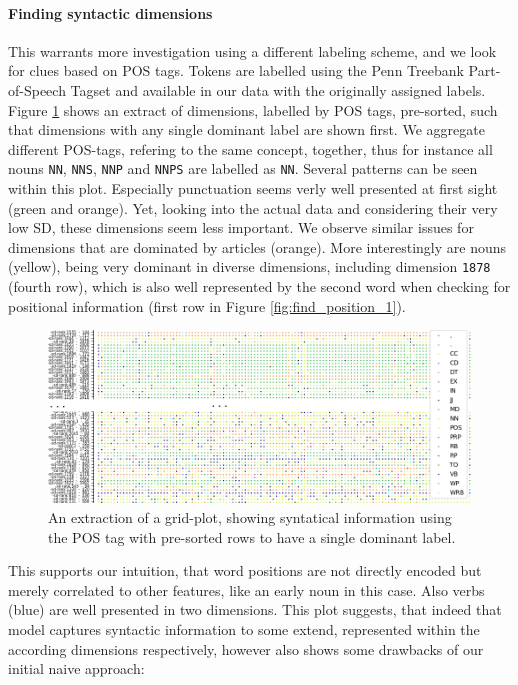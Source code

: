 \paragraph*{Finding syntactic dimensions}
This warrants more investigation using a different labeling scheme, and we look for clues based on \ac{POS} tags. Tokens are labelled using the Penn Treebank Part-of-Speech Tagset \citep{marcus1993building} and available in our data with the originally assigned labels. Figure \ref{fig:find_syntax} shows an extract of dimensions, labelled by \ac{POS} tags, pre-sorted, such that dimensions with any single dominant label are shown first. We aggregate different \ac{POS}-tags, refering to the same concept, together, thus for instance all nouns \texttt{NN}, \texttt{NNS}, \texttt{NNP} and \texttt{NNPS} are labelled as \texttt{NN}. Several patterns can be seen within this plot. Especially punctuation seems verly well presented at first sight (green and orange). Yet, looking into the actual data and considering their very low \ac{SD}, these dimensions seem less important. We observe similar issues for dimensions that are dominated by articles (orange). More interestingly are nouns (yellow), being very dominant in diverse dimensions, including dimension \texttt{1878} (fourth row), which is also well represented by the second word when checking for positional information (first row in Figure \ref{fig:find_position_1}). 
\begin{figure}[tph!]
\centering
	\includegraphics[totalheight=7cm]{fig/finsynpos3.png}
	\caption{An extraction of a grid-plot, showing syntatical information using the \ac{POS} tag with pre-sorted rows to have a single dominant label.}
	\label{fig:find_syntax}
\end{figure}
\noindent
This supports our intuition, that word positions are not directly encoded but merely correlated to other features, like an early noun in this case. Also verbs (blue) are well presented in two dimensions. This plot suggests, that indeed that model captures syntactic information to some extend, represented within the according dimensions respectively, however also shows some drawbacks of our initial naive approach:
